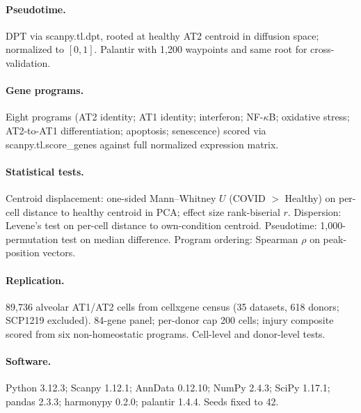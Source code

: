 \documentclass[11pt]{article}
\begin{document}
\paragraph{Pseudotime.} DPT \citep{Haghverdi2016} via scanpy.tl.dpt, rooted at healthy AT2 centroid in diffusion space; normalized to $[0,1]$. Palantir \citep{Setty2019} with 1{,}200 waypoints and same root for cross-validation.

\paragraph{Gene programs.} Eight programs (AT2 identity; AT1 identity; interferon; NF-$\kappa$B; oxidative stress; AT2-to-AT1 differentiation; apoptosis; senescence) scored via scanpy.tl.score\_genes against full normalized expression matrix.

\paragraph{Statistical tests.} Centroid displacement: one-sided Mann--Whitney $U$ (COVID $>$ Healthy) on per-cell distance to healthy centroid in PCA; effect size rank-biserial $r$. Dispersion: Levene's test on per-cell distance to own-condition centroid. Pseudotime: 1{,}000-permutation test on median difference. Program ordering: Spearman $\rho$ on peak-position vectors.

\paragraph{Replication.} 89{,}736 alveolar AT1/AT2 cells from cellxgene census (35 datasets, 618 donors; SCP1219 excluded). 84-gene panel; per-donor cap 200 cells; injury composite scored from six non-homeostatic programs. Cell-level and donor-level tests.

\paragraph{Software.} Python 3.12.3; Scanpy 1.12.1; AnnData 0.12.10; NumPy 2.4.3; SciPy 1.17.1; pandas 2.3.3; harmonypy 0.2.0; palantir 1.4.4. Seeds fixed to 42.
\end{document}
